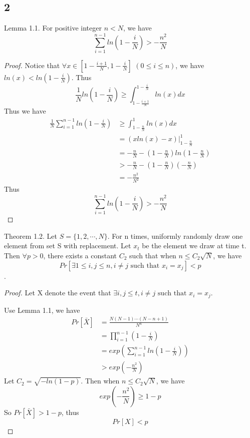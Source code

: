 \documentclass{article}
\begin{document}
\begin{spacing}{1.1}
    \subsection*{2}
    Lemma 1.1. For positive integer $n < N$, we have
    $$\sum_{i=1}^{n-1}ln(1 - \frac{i}{N}) >-\frac{n^2}{N}$$
    \begin{proof}
        Notice that $\forall x\in [1 -\frac{i+1}{N}, 1 - \frac{i}{N}]$ $(0\leq i\leq n)$, we have $ln(x) < ln(1 - \frac{i}{N})$. Thus
        $$\frac{1}{N}ln(1 - \frac{i}{N}) \geq \int_{1 - \frac{i+1}{N}}^{1 - \frac{i}{N}}ln(x)dx$$
        Thus we have
        \begin{equation}
            \begin{aligned}
                \frac{1}{N}\sum_{i=1}^{n-1}ln(1 - \frac{i}{N}) &\geq \int_{1-\frac{n}{N}}^1 ln(x)dx\\
                &= (xln(x) - x)|_{1-\frac{n}{N}}^1\\
                &= -\frac{n}{N} - (1 - \frac{n}{N})ln(1 - \frac{n}{N})\\
                &> -\frac{n}{N} - (1 - \frac{n}{N})(-\frac{n}{N})\\
                &= - \frac{n^2}{N^2}
            \end{aligned}
        \end{equation}
        Thus
        $$\sum_{i=1}^{n-1}ln(1 - \frac{i}{N}) > -\frac{n^2}{N}$$
    \end{proof}
    Theorem 1.2. Let $S = \{1, 2, \cdots, N\}$. For n times, uniformly randomly draw one element from set S with replacement. Let $x_t$ be the element we draw at time t. Then $\forall p > 0$, there exists a constant $C_2$ such that when $n \leq C_2 \sqrt{N}$, we have
    $$Pr[\exists 1\leq i, j \leq n, i\not = j \text{ such that } x_i = x_j] < p$$.
    \begin{proof}
        Let X denote the event that $\exists i, j \leq t, i\not = j \text{ such that } x_i = x_j$.

        Use Lemma 1.1, we have
        \begin{equation}
            \begin{aligned}
                Pr[\bar{X}] &= \frac{N(N-1)\cdots (N-n+1)}{N^n}\\
                &= \prod_{i=1}^{n-1}(1 - \frac{i}{N})\\
                &= exp(\sum_{i=1}^{n-1}ln(1 - \frac{i}{N}))\\
                &> exp(-\frac{n^2}{N})
            \end{aligned}
        \end{equation}
        Let $C_2 = \sqrt{-ln(1-p)}$. Then when $n \leq C_2\sqrt{N}$, we have
        $$exp(-\frac{n^2}{N}) \geq 1 - p$$
        So $Pr[\bar{X}] > 1 - p$, thus
        $$Pr[X] < p$$
    \end{proof}

\end{spacing}
\end{document}
